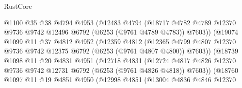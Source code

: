 \begin{lexlean}{RustCore}
\begin{coremodule}
                            @1100
                            @35
                            @38
                            @4794
                            @4953
                            (@12483
                              @4794
                              (@18717
                                @4782
                                @4789
                                @12370
                                @9736
                                @9742
                                @12496
                                @6792
                                (@6253 (@9761 @4789 @4783))
                                @7603))
                            (@19074
                              @1099
                              @11
                              @37
                              @4812
                              @4952
                              (@12359
                                @4812
                                (@12365
                                  @4799
                                  @4807
                                  @12370
                                  @9736
                                  @9742
                                  @12375
                                  @6792
                                  (@6253 (@9761 @4807 @4800))
                                  @7603))
                              (@18739
                                @1098
                                @11
                                @20
                                @4831
                                @4951
                                (@12718
                                  @4831
                                  (@12724
                                    @4817
                                    @4826
                                    @12370
                                    @9736
                                    @9742
                                    @12731
                                    @6792
                                    (@6253 (@9761 @4826 @4818))
                                    @7603))
                                (@18760
                                  @1097
                                  @11
                                  @19
                                  @4851
                                  @4950
                                  (@12998
                                    @4851
                                    (@13004
                                      @4836
                                      @4846
                                      @12370

\end{coremodule}
\end{lexlean}
